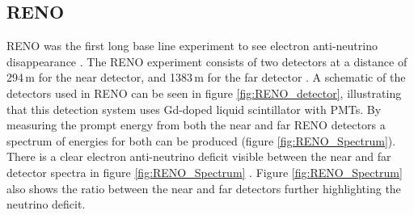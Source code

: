 \subsection{RENO} \label{subSec:reno}
RENO was the first long base line experiment to see electron anti-neutrino disappearance \cite{Olive_2014}. The RENO experiment consists of two detectors at a distance of 294\,m for the near detector, and 1383\,m for the far detector \cite{reno_may_2012}. A schematic of the detectors used in RENO can be seen in figure \ref{fig:RENO_detector}, illustrating that this detection system uses Gd-doped liquid scintillator with PMTs. By measuring the prompt energy from both the near and far RENO detectors a spectrum of energies for both can be produced (figure \ref{fig:RENO_Spectrum}). There is a clear electron anti-neutrino deficit visible between the near and far detector spectra in figure \ref{fig:RENO_Spectrum} \cite{reno_may_2012}. Figure \ref{fig:RENO_Spectrum} also shows the ratio between the near and far detectors further highlighting the neutrino deficit. 

